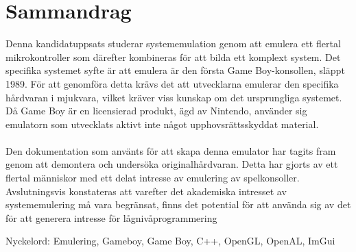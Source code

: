 \thispagestyle{plain}			%
\setlength{\parskip}{0pt plus 1.0pt}
\section*{\centering Sammandrag}
Denna kandidatuppsats studerar systememulation genom att emulera ett flertal mikrokontroller som därefter kombineras för att bilda ett komplext system. Det specifika systemet syfte är att emulera är den första Game Boy-konsollen, släppt 1989. För att genomföra detta krävs det att utvecklarna emulerar den specifika hårdvaran i mjukvara, vilket kräver viss kunskap om det ursprungliga systemet. 
Då Game Boy är en licensierad produkt, ägd av Nintendo, använder sig emulatorn som utvecklats aktivt inte något upphovsrättsskyddat material.
\\\\
Den dokumentation som använts för att skapa denna emulator har tagits fram genom att demontera och undersöka originalhårdvaran. Detta har gjorts av ett flertal människor med ett delat intresse av emulering av spelkonsoller. Avslutningsvis konstateras att varefter det akademiska intresset av systememulering må vara begränsat, finns det potential för att använda sig av det för att generera intresse för lågnivåprogrammering 





\vfill
Nyckelord: Emulering, Gameboy, Game Boy, C++, OpenGL, OpenAL, ImGui

\newpage				%
\thispagestyle{plain}
\mbox{}